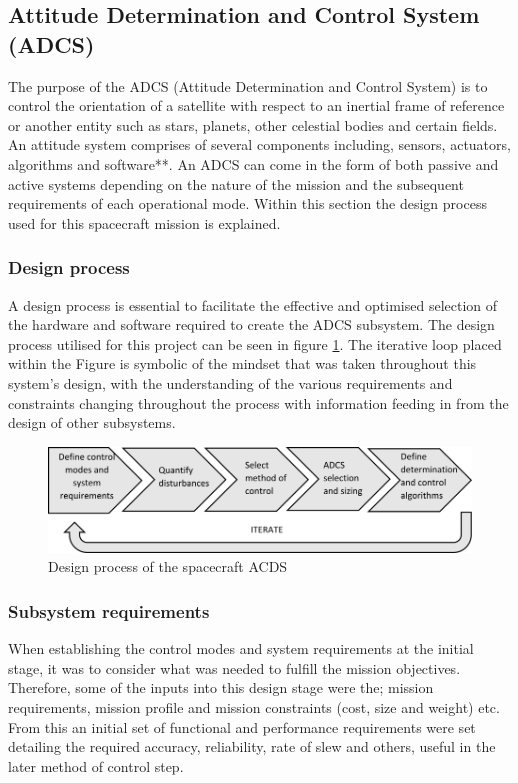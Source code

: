 \subsection{Attitude Determination and Control System (ADCS)}

The purpose of the ADCS (Attitude Determination and Control System) is to control
the orientation of a satellite with respect to an inertial frame of reference or
another entity such as stars, planets, other celestial bodies and certain fields.
An attitude system comprises of several components including, sensors, actuators,
algorithms and software**. An ADCS can come in the form of both passive and active
systems depending on the nature of the mission and the subsequent requirements of
each operational mode. Within this section the design process used for this
spacecraft mission is explained.

\subsubsection{Design process}
A design process is essential to facilitate the effective and optimised selection
of the hardware and software required to create the ADCS subsystem. The design
process utilised for this project can be seen in figure \ref{fig:adcs_design}.
The iterative loop placed within the Figure is symbolic of the mindset that was
taken throughout this system’s design, with the understanding of the various
requirements and constraints changing throughout the process with information
feeding in from the design of other subsystems.

\begin{figure}[h]
	\centering
	\includegraphics[width=\textwidth]{img/ADCS_design.png}
	\caption{Design process of the spacecraft ACDS}
	\label{fig:adcs_design}
\end{figure}

\subsubsection{Subsystem requirements}

When establishing the control modes and system requirements at the initial stage,
it was to consider what was needed to fulfill the mission objectives. Therefore,
some of the inputs into this design stage were the; mission requirements, mission
profile and mission constraints (cost, size and weight) etc. From this an initial
set of functional and performance requirements were set detailing the required
accuracy, reliability, rate of slew and others, useful in the later method of
control step.

